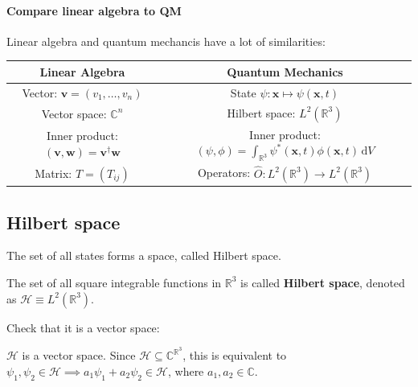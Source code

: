 \documentclass[a4paper,11pt]{article}
\begin{document}
\paragraph{Compare linear algebra to QM} Linear algebra and quantum mechancis have a lot of similarities: 
\begin{center}
\begin{tabular}{cc}
    \toprule 
    \textbf{Linear Algebra} & \textbf{Quantum Mechanics} \\ \midrule
    Vector: $\displaystyle \mathbf{v} = (v_1,\dots,v_n)$ & State $ \psi: \mathbf{x} \mapsto \psi(\mathbf{x},t) $ \\[0.4em] 
    Vector space: $ \mathbb{C}^n $ & Hilbert space: $ L^2( \mathbb{R}^{3}) $ \\[0.4em]  
    Inner product: $ (\mathbf{v},\mathbf{w}) = \mathbf{v}^\dagger \mathbf{w} $ & Inner product: $\displaystyle (\psi,\phi) = \int_{\mathbb{R}^3} \psi^*(\mathbf{x},t)\phi(\mathbf{x},t) \,\mathrm{d}V$ \\[1em]  
    Matrix: $ T = (T_{ij}) $ & Operators: $ \hat{O}: L^2( \mathbb{R}^{3})\to L^2( \mathbb{R}^{3}) $\\
    \bottomrule
\end{tabular}
\end{center}

\subsection{Hilbert space}
The set of all states forms a space, called Hilbert space. 
\begin{definition}
    The set of all square integrable functions in $ \mathbb{R}^3 $ is called \textbf{Hilbert space}, denoted as $ \mathcal{H} \equiv L^2(\mathbb{R}^3) $.
\end{definition}
Check that it is a vector space: 
\begin{proposition}
    $ \mathcal{H} $ is a vector space. Since $ \mathcal{H} \subseteq \mathbb{C}^{\mathbb{R}^3} $, this is equivalent to $ \psi_1,\psi_2\in \mathcal{H} \implies a_1 \psi_1+a_2\psi_2\in \mathcal{H} $, where $ a_1,a_2\in \mathbb{C} $.
\end{proposition}
\end{document}
